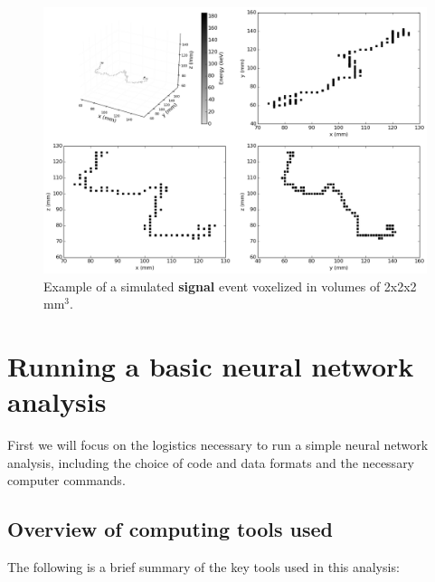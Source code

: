 \documentclass[10pt]{article}
\begin{document}
\begin{figure}[!ht]
	\centering
	\includegraphics[scale=0.4]{fig/plt_dnn3d_NEXT100_Paolina222_v2x2x2_r200x200x200_si_2.png}
	\caption{\label{fig_siexample}Example of a simulated \textbf{signal} event voxelized in volumes of 2x2x2 mm$^3$.}
\end{figure}

\section{Running a basic neural network analysis}\label{s_basicanalysis}
\noindent First we will focus on the logistics necessary to run a simple neural network analysis, including the choice of code and data formats 
and the necessary computer commands.

\subsection{Overview of computing tools used}\label{ss_computingtools}
\noindent The following is a brief summary of the key tools used in this analysis:
\end{document}
